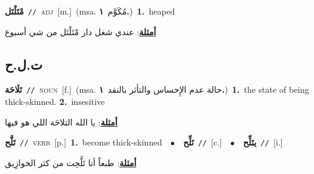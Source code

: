 \documentclass[10pt,a4paper,twoside]{article} %
\begin{document}
\begin{multicols}{2}
{\setlength\topsep{0pt}\textbf{\foreignlanguage{arabic}{مْتَلْتَل}}\ {\color{gray}\texttt{//}\color{black}}\ \textsc{adj}\ [m.]\ \color{gray}(msa. \foreignlanguage{arabic}{مُكَوَّم}~\foreignlanguage{arabic}{\textbf{١.}})\color{black}\ \textbf{1.}~heaped\  \begin{flushright}\color{gray}\foreignlanguage{arabic}{\textbf{\underline{\foreignlanguage{arabic}{أمثلة}}}: عندي شغل دار مْتَلْتَل من شي أسبوع}\end{flushright}\color{black}} \vspace{2mm}

\vspace{-3mm}
\subsection*{\color{blue}\foreignlanguage{arabic}{ت.ل.ح}\color{blue}{}} 

{\setlength\topsep{0pt}\textbf{\foreignlanguage{arabic}{تَلَاحَة}}\ {\color{gray}\texttt{//}\color{black}}\ \textsc{noun}\ [f.]\ \color{gray}(msa. \foreignlanguage{arabic}{حالة عدم الإِحساس والتأثر بالنقد}~\foreignlanguage{arabic}{\textbf{١.}})\color{black}\ \textbf{1.}~the state of being thick-skinned.  \textbf{2.}~insesitive\  \begin{flushright}\color{gray}\foreignlanguage{arabic}{\textbf{\underline{\foreignlanguage{arabic}{أمثلة}}}: يا الله التلاحَة اللي هو فيها}\end{flushright}\color{black}} \vspace{2mm}

{\setlength\topsep{0pt}\textbf{\foreignlanguage{arabic}{تَلَّح}}\ {\color{gray}\texttt{//}\color{black}}\ \textsc{verb}\ [p.]\ \textbf{1.}~become thick-skinned\ \ $\bullet$\ \ \setlength\topsep{0pt}\textbf{\foreignlanguage{arabic}{تَلِّح}}\ {\color{gray}\texttt{//}\color{black}}\ [c.]\ \ $\bullet$\ \ \setlength\topsep{0pt}\textbf{\foreignlanguage{arabic}{يتَلِّح}}\ {\color{gray}\texttt{//}\color{black}}\ [i.]\  \begin{flushright}\color{gray}\foreignlanguage{arabic}{\textbf{\underline{\foreignlanguage{arabic}{أمثلة}}}: طبعاً أنا تَلَّحِت من كثر الخوازِيق}\end{flushright}\color{black}} \vspace{2mm}


\end{multicols}
\end{document}
